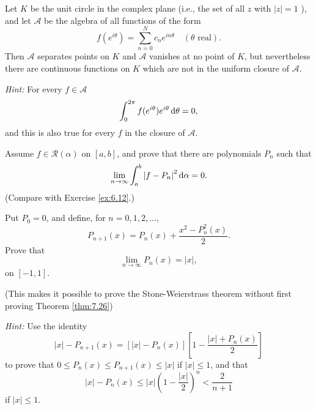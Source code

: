 \begin{myexercise}
    \label{ex:7.21}
    Let $K$ be the unit circle in the complex plane 
    (i.e., the set of all $z$ with $| z | = 1$ ), 
    and let $\mathscr{A}$ be the algebra of all functions of the form
    \begin{equation*}
        f(e^{i \theta}) = \sum_{n=0}^{N} c_n e^{i n \theta} \quad 
        (\theta \text{ real}).
    \end{equation*}
    Then $\mathscr{A}$ separates points on $K$ and $\mathscr{A}$ vanishes at no point of $K$, but nevertheless there are continuous functions on $K$ which are not in the uniform closure of $\mathscr{A}$. 

    \emph{Hint:} For every $f \in \mathscr{A}$
    \begin{equation*}
        \int_{0}^{2\pi} f(e^{i\theta})e^{i\theta} \d \theta = 0 ,
    \end{equation*}
    and this is also true for every $f$ in the closure of $\mathscr{A}$.
\end{myexercise}


\begin{myexercise}
    \label{ex:7.22}
    Assume $f \in \mathscr{R}(\alpha)$ on $[a, b]$, and prove that there are polynomials $P_n$ such that
    \begin{equation*}
        \lim_{n \to \infty} \int_{a}^{b} \left| f - P_n \right|^2 \d \alpha = 0 . 
    \end{equation*}
    (Compare with Exercise \ref{ex:6.12}.)
\end{myexercise}


\begin{myexercise}
    \label{ex:7.23}
    Put $P_0 = 0$, and define, for $n=0,1,2,\dots$,
    \begin{equation*}
        P_{n+1}(x) = P_n(x) + \frac{x^2 - P_n^2(x)}{2}.
    \end{equation*}
    Prove that 
    \begin{equation*}
        \lim_{n \to \infty} P_n(x) = \left| x \right| ,
    \end{equation*}
     on $[-1,1]$.

    (This makes it possible to prove the Stone-Weierstrass theorem without first proving Theorem \ref{thm:7.26})

    \emph{Hint:} Use the identity 
    \begin{equation*}
        |x| - P_{n+1}(x) = \left[ |x| - P_n(x) \right]\left[ 1-\frac{|x|+P_n(x)}{2} \right]
    \end{equation*}
    to prove that $0 \leq P_n(x) \leq P_{n+1}(x) \leq |x|$ if $|x| \leq 1$, and that 
    \begin{equation*}
        |x| - P_n(x) \leq |x| \left( 1-\frac{|x|}{2} \right)^n < \frac{2}{n+1}
    \end{equation*}
    if $|x| \leq 1$.
\end{myexercise}


